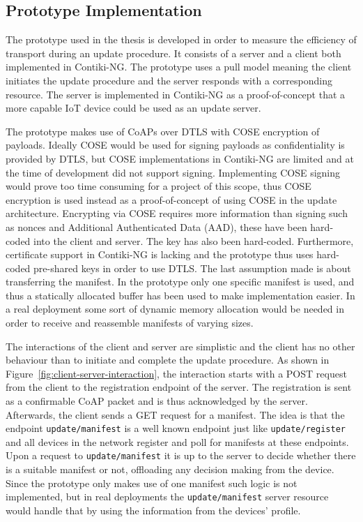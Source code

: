 \documentclass[0-thesis.tex]{subfiles}
\begin{document}
\subsection{Prototype Implementation}
\label{ssec:prototype-implementation}
The prototype used in the thesis is developed in order to measure the efficiency of
transport during an update procedure. It consists of a server and a client both
implemented in Contiki-NG. The prototype uses a pull model meaning the client  initiates
the update procedure and the server responds with a corresponding resource. The server is
implemented in Contiki-NG as a proof-of-concept that a more capable IoT device could be
used as an update server.

The prototype makes use of CoAPs over DTLS with COSE encryption of payloads. Ideally COSE
would be used for signing payloads as confidentiality is provided by DTLS, but COSE
implementations in Contiki-NG are limited and at the time of development did not support
signing. Implementing COSE signing would prove too time consuming for a project of this
scope, thus COSE encryption is used instead as a proof-of-concept of using COSE in the
update architecture. Encrypting via COSE requires more information than signing such as
nonces and Additional Authenticated Data (AAD), these have been hard-coded into the client
and server. The key has also been hard-coded. Furthermore, certificate support in
Contiki-NG is lacking and the prototype thus uses hard-coded pre-shared keys in order to
use DTLS. The last assumption made is about transferring the manifest. In the prototype
only one specific manifest is used, and thus a statically allocated buffer has been used
to make implementation easier. In a real deployment some sort of dynamic memory allocation
would be needed in order to receive and reassemble manifests of varying sizes.

The interactions of the client and server are simplistic and the client has no other
behaviour than to initiate and complete the update procedure. As shown in
Figure~\ref{fig:client-server-interaction}, the interaction starts with a POST request
from the client to the registration endpoint of the server. The registration is sent as a
confirmable CoAP packet and is thus acknowledged by the server. Afterwards, the client
sends a GET request for a manifest. The idea is that the endpoint \texttt{update/manifest}
is a well known endpoint just like \texttt{update/register} and all devices in the network
register and poll for manifests at these endpoints. Upon a request to
\texttt{update/manifest} it is up to the server to decide whether there is a suitable
manifest or not, offloading any decision making from the device. Since the prototype only
makes use of one manifest such logic is not implemented, but in real deployments the
\texttt{update/manifest} server resource would handle that by using the information from
the devices' profile.
\end{document}
